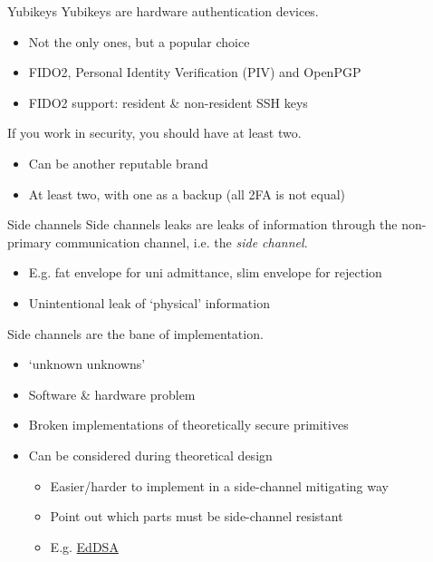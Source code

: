 \begin{frame}{Yubikeys}
  Yubikeys are hardware authentication devices.
  \begin{itemize}[<+(1)->]
    \item Not the only ones, but a popular choice
    \item FIDO2, Personal Identity Verification (PIV) and OpenPGP
    \item FIDO2 support: resident \& non-resident SSH keys
  \end{itemize}

  \vspace*{1em}

  \pause
  If you work in security, you should have at least two.
  \begin{itemize}[<+(1)->]
    \item Can be another reputable brand
    \item At least two, with one as a backup (all 2FA is not equal)
  \end{itemize}
\end{frame}

\begin{frame}{Side channels}
  Side channels leaks are leaks of information through the non-primary communication channel, i.e. the \emph{side channel}.
  \begin{itemize}[<+(1)->]
    \item E.g. fat envelope for uni admittance, slim envelope for rejection
    \item Unintentional leak of `physical' information
  \end{itemize}

  \vspace*{1em}

  \pause
  Side channels are the bane of implementation.
  \begin{itemize}[<+(1)->]
    \item `unknown unknowns'
    \item Software \& hardware problem
    \item Broken implementations of theoretically secure primitives
    \item Can be considered during theoretical design
    \begin{itemize}
      \item Easier/harder to implement in a side-channel mitigating way
      \item Point out which parts must be side-channel resistant
      \item E.g. \href{https://ed25519.cr.yp.to/ed25519-20110926.pdf}{EdDSA}
    \end{itemize}
  \end{itemize}
\end{frame}

